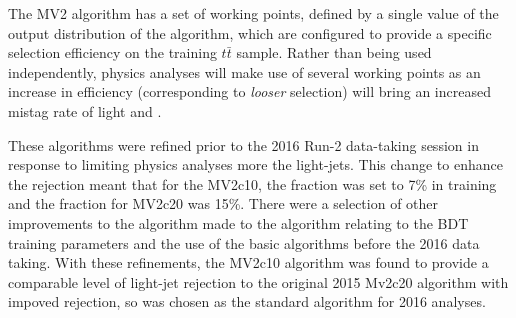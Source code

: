 	The MV2 algorithm has a set of working points, defined by a single value of the output distribution of the algorithm, which are configured to provide a specific \bjet selection efficiency on the training $t\bar{t}$ sample. Rather than being used independently, physics analyses will make use of several working points as an increase in \bjet efficiency (corresponding to \textit{looser} \bjet selection) will bring an increased mistag rate of light and \cjets.
	
	These algorithms were refined prior to the 2016 Run-2 data-taking session in response to \cjets limiting physics analyses more the light-jets. This change  to enhance the \cjet rejection meant that for the MV2c10, the \cjet fraction was set to 7\% in training and the fraction for MV2c20 was 15\%. There were a selection of other improvements to the algorithm made to the algorithm relating to the BDT training parameters and the use of the basic algorithms before the 2016 data taking. With these refinements, the MV2c10 algorithm was found to provide a comparable level of light-jet rejection to the original 2015 Mv2c20 algorithm with impoved \cjet rejection, so was chosen as the standard \btagging algorithm for 2016 analyses. \cite{btagOptimisation}
	
	
	
	
	
\endinput
